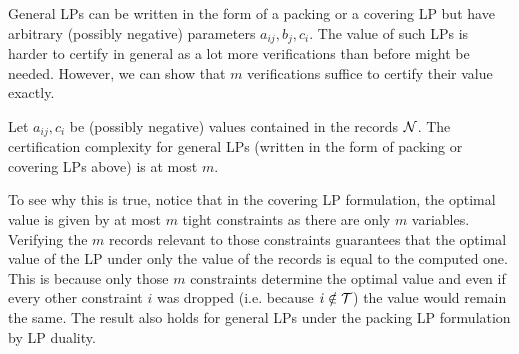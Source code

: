   General LPs can be written in the form of a packing or a covering LP but have arbitrary (possibly negative) parameters 
$a_{ij}, b_j, c_i$. The value of such LPs is harder to certify in general as a lot more verifications than before might be 
needed. However, we can show that $m$ verifications suffice to certify their value exactly.

\begin{lemma} \label{lem:generalLp}
    Let $a_{ij}, c_i$ be (possibly negative) values contained in the records $\mathcal{N}$. The certification complexity for 
  general LPs (written in the form of packing or covering LPs above) is at most $m$.
\end{lemma}

  To see why this is true, notice that in the covering LP formulation, the optimal value is given by at most $m$ tight 
constraints as there are only $m$ variables. Verifying the $m$ records relevant to those constraints guarantees that the 
optimal value of the LP under only the value of the records is equal to the computed one. This is because only those $m$ 
constraints determine the optimal value and even if every other constraint $i$ was dropped (i.e. because $i \notin \mathcal{T}$)
the value would remain the same. The result also holds for general LPs under the packing LP formulation by LP duality.
